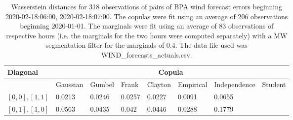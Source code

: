 \begin{table}[h] 
    \centering 
    \begin{tabular}{|l|l|l|l|l|l|l|l|} \hline 
        \textbf{Diagonal} & \multicolumn{7}{c|}{\textbf{Copula}} \\ \hline 
        & Gaussian & Gumbel & Frank & Clayton & Empirical & Independence & Student \\ \hline 
        $[0,0], [1,1]$ & 0.0213 & 0.0246 & 0.0257 & 0.0227 & 0.0091 & 0.0655 &  \\ \hline 
        $[0,1], [1,0]$ & 0.0563 & 0.0435 & 0.042 & 0.0446 & 0.0288 & 0.1779 &  \\ \hline 
    \end{tabular} 
    \caption{Wasserstein distances for 318 observations of pairs of BPA wind forecast errors beginning 2020-02-18:06:00, 2020-02-18:07:00. The copulas were fit  using an average of 206 observations beginning 2020-01-01. The marginals were fit using an average of 83 observations of respective hours (i.e. the  marginals for the two hours were computed separately) with a MW segmentation filter for the marginals of 0.4. The data file used was WIND\_forecasts\_actuals.csv.} 
\end{table}